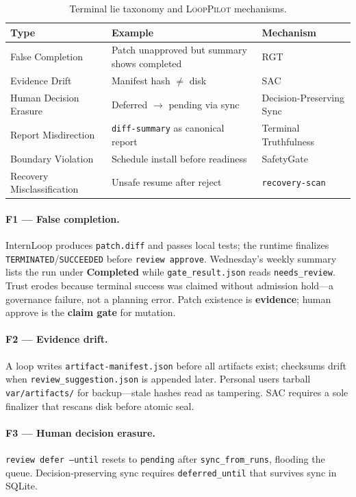 \documentclass[11pt]{article}
\newcommand{\looppilot}{\textsc{LoopPilot}}
\newcommand{\rgt}{\textsc{RGT}}
\newcommand{\sac}{\textsc{SAC}}
\begin{document}
\begin{table}[t]
  \centering
  \caption{Terminal lie taxonomy and \looppilot{} mechanisms.}
  \label{tab:terminal-lies}
  \small
  \begin{tabularx}{\linewidth}{@{}l X l@{}}
    \toprule
    \textbf{Type} & \textbf{Example} & \textbf{Mechanism} \\
    \midrule
    False Completion & Patch unapproved but summary shows completed & \rgt{} \\
    Evidence Drift & Manifest hash $\neq$ disk & \sac{} \\
    Human Decision Erasure & Deferred $\rightarrow$ pending via sync & Decision-Preserving Sync \\
    Report Misdirection & \texttt{diff-summary} as canonical report & Terminal Truthfulness \\
    Boundary Violation & Schedule install before readiness & SafetyGate \\
    Recovery Misclassification & Unsafe resume after reject & \texttt{recovery-scan} \\
    \bottomrule
  \end{tabularx}
\end{table}

\paragraph{F1 --- False completion.}
InternLoop produces \texttt{patch.diff} and passes local tests; the runtime finalizes \texttt{TERMINATED}/\texttt{SUCCEEDED} before \texttt{review approve}.
Wednesday's weekly summary lists the run under \textbf{Completed} while \texttt{gate\_result.json} reads \texttt{needs\_review}.
Trust erodes because terminal success was claimed without admission hold---a governance failure, not a planning error.
Patch existence is \textbf{evidence}; human approve is the \textbf{claim gate} for mutation.

\paragraph{F2 --- Evidence drift.}
A loop writes \texttt{artifact-manifest.json} before all artifacts exist; checksums drift when \texttt{review\_suggestion.json} is appended later.
Personal users tarball \texttt{var/artifacts/} for backup---stale hashes read as tampering.
\sac{} requires a sole finalizer that rescans disk before atomic seal.

\paragraph{F3 --- Human decision erasure.}
\texttt{review defer --until} resets to \texttt{pending} after \texttt{sync\_from\_runs}, flooding the queue.
Decision-preserving sync requires \texttt{deferred\_until} that survives sync in SQLite.
\end{document}
